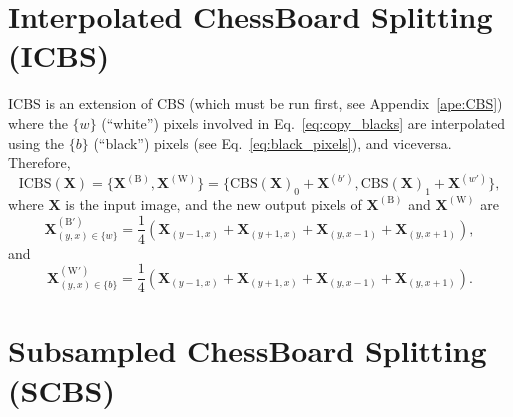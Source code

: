\documentclass{article}
\begin{document}

\section{Interpolated ChessBoard Splitting (ICBS)}
\label{ape:ICBS}

ICBS is an extension of CBS (which must be run first, see
Appendix~\ref{ape:CBS}) where the $\{w\}$ (``white'') pixels involved
in Eq.~\ref{eq:copy_blacks} are interpolated using the $\{b\}$
(``black'') pixels (see Eq.~\ref{eq:black_pixels}), and
viceversa. Therefore,
\begin{equation}
  \mathrm{ICBS}(\mathbf{X})=\{\mathbf{X}^{(\text{B})},\mathbf{X}^{(\text{W})}\}=\{\text{CBS}(\mathbf{X})_0 + \mathbf{X}^{(b')},\text{CBS}(\mathbf{X})_1 + \mathbf{X}^{(w')}\},
\end{equation}
where $\mathbf{X}$ is the input image, and the new output pixels of
$\mathbf{X}^{(\text{B})}$ and $\mathbf{X}^{(\text{W})}$ are
\begin{equation}
  \mathbf{X}^{(\text{B}')}_{(y,x)\in\{w\}} = \frac{1}{4}(\mathbf{X}_{(y-1,x)}+\mathbf{X}_{(y+1,x)}+\mathbf{X}_{(y,x-1)}+\mathbf{X}_{(y,x+1)}),
\end{equation}
and
\begin{equation}
  \mathbf{X}^{(\text{W}')}_{(y,x)\in\{b\}} = \frac{1}{4}(\mathbf{X}_{(y-1,x)}+\mathbf{X}_{(y+1,x)}+\mathbf{X}_{(y,x-1)}+\mathbf{X}_{(y,x+1)}).
\end{equation}


\section{Subsampled ChessBoard Splitting (SCBS)}
\label{ape:SCBS}
\end{document}
